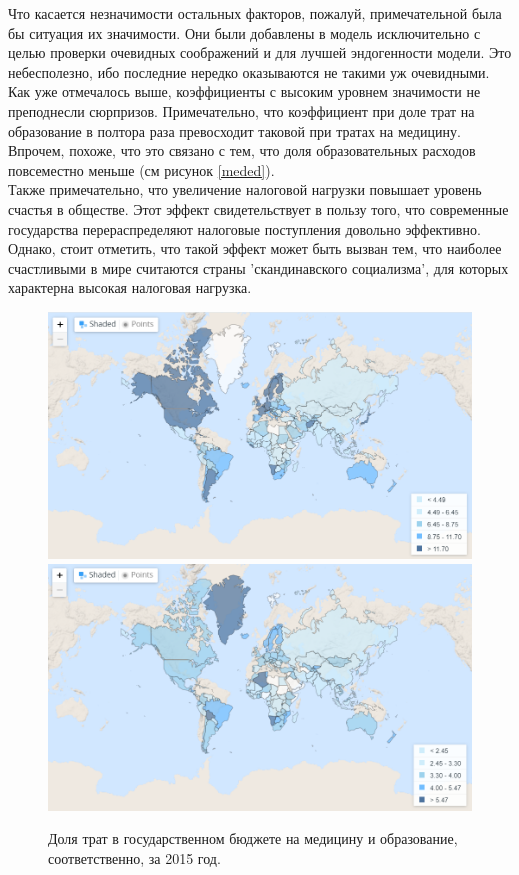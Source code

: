 \documentclass[russian]{vegareport}
\begin{document}
        Что касается незначимости остальных факторов, пожалуй, примечательной была бы ситуация их значимости. 
        Они были добавлены в модель исключительно с целью проверки очевидных соображений и для лучшей эндогенности модели. 
        Это небесполезно, ибо последние нередко оказываются не такими уж очевидными.
        \\
        Как уже отмечалось выше, коэффициенты с высоким уровнем значимости не преподнесли сюрпризов. 
        Примечательно, что коэффициент при доле трат на образование в полтора раза превосходит таковой при тратах на медицину.
         Впрочем, похоже, что это связано с тем, что доля образовательных расходов повсеместно меньше (см рисунок \ref{meded}).
        \\
        Также примечательно, что увеличение налоговой нагрузки повышает уровень счастья в обществе. 
        Этот эффект свидетельствует в пользу того, что современные государства перераспределяют 
        налоговые поступления довольно эффективно. Однако, стоит отметить, что такой эффект 
        может быть вызван тем, что наиболее счастливыми в мире считаются страны 'скандинавского социализма', 
        для которых характерна высокая налоговая нагрузка.

        \begin{figure} \label{meded}
            \centering
            \includegraphics[scale=0.5]{meded1.png}
            \includegraphics[scale=0.5]{meded2.png}
            \caption{Доля трат в государственном бюджете на медицину и образование, соответственно, за 2015 год.}
            \label{lect02:pic1}
        \end{figure}
\end{document}
